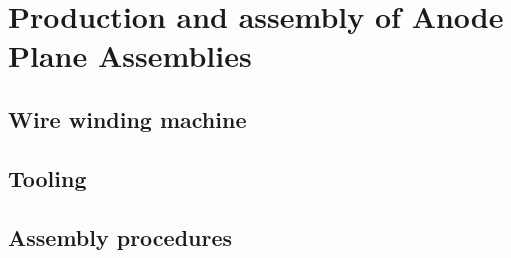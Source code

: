\chapter{Production and assembly of Anode Plane Assemblies}
\label{ch:fdsp-apa-prod-assy}

\section{Wire winding machine}
\label{sec:fdsp-apa-winding}


\section{Tooling}
\label{sec:fdsp-apa-tooling}


\section{Assembly procedures}
\label{sec:fdsp-apa-assy}




